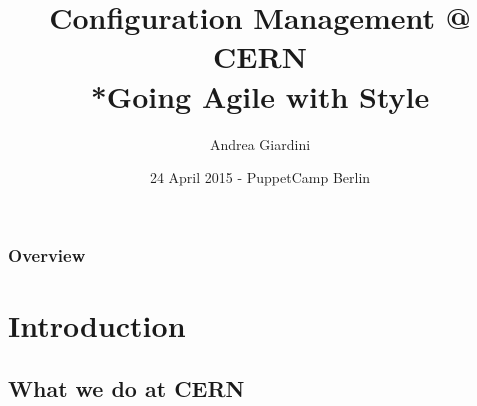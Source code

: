 \documentclass{beamer}
\title[Configuration Management @ CERN]{Configuration Management @ CERN\\*Going Agile with Style}
\author{Andrea Giardini}
\institute[CERN]
{
CERN \\
\medskip
\textit{andrea.giardini@cern.ch}
}
\date{24 April 2015 - PuppetCamp Berlin} %
\begin{document}
\begin{frame}
\titlepage
\end{frame}

\begin{frame}
\frametitle{Overview}
\tableofcontents
\end{frame}


\section{Introduction}

\subsection{What we do at CERN}
\end{document}
